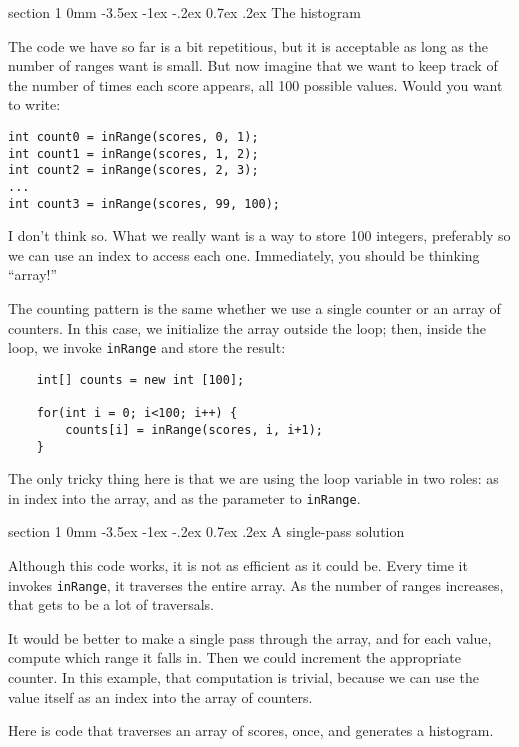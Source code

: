 \documentclass{book}
\makeatletter
\renewcommand{\section}{\@startsection 
    {section} {1} {0mm}%
    {-3.5ex \@plus -1ex \@minus -.2ex}%
    {0.7ex \@plus.2ex}%
    {\normalfont\Large\bfseries}}
\makeatother
\begin{document}
\section{The histogram}

The code we have so far is a bit repetitious, but it is acceptable as
long as the number of ranges want is small.  But now imagine that
we want to keep track of the number of times each score appears,
all 100 possible values.  Would you want to write:

\begin{verbatim}
int count0 = inRange(scores, 0, 1);
int count1 = inRange(scores, 1, 2);
int count2 = inRange(scores, 2, 3);
...
int count3 = inRange(scores, 99, 100);
\end{verbatim}

I don't think so.  What we really want is a
way to store 100 integers, preferably
so we can use an index to access each one.  Immediately,
you should be thinking ``array!''

The counting pattern is the same whether we use a single counter or an
array of counters.  In this case, we initialize the array outside the
loop; then, inside the loop, we invoke {\tt inRange} and store the
result:

\begin{verbatim}
    int[] counts = new int [100];

    for(int i = 0; i<100; i++) {
        counts[i] = inRange(scores, i, i+1);
    }
\end{verbatim}
%
The only tricky thing here is that we are using the loop variable
in two roles: as in index into the array, and as the parameter to
{\tt inRange}.


\section{A single-pass solution}

Although this code works, it is not as efficient as it could
be.  Every time it invokes {\tt inRange}, it traverses the
entire array.  As the number of ranges increases, that gets
to be a lot of traversals.

It would be better to make a single pass through the array,
and for each value, compute which range it falls in.  Then
we could increment the appropriate counter.
In this example, that computation is trivial, because we
can use the value itself as an index into the array of counters.

Here is code that traverses an array of scores, once, and generates
a histogram.
\end{document}
